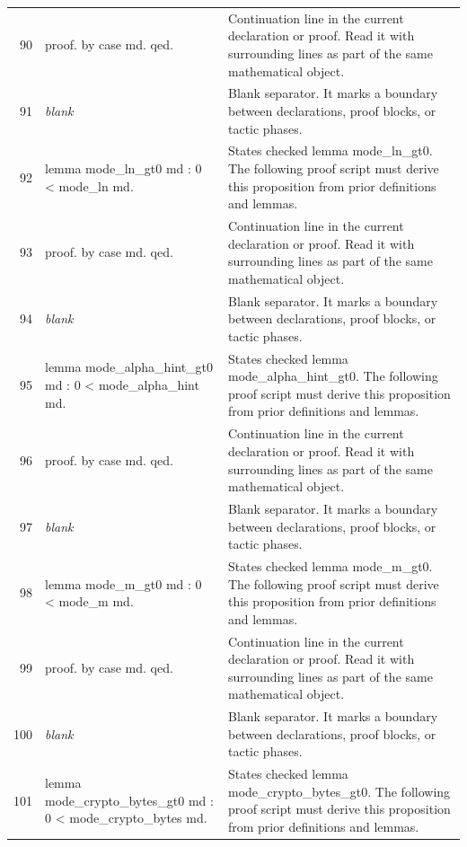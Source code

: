 \documentclass[10pt]{article}
\begin{document}
\begin{longtable}{r L{0.53\textwidth} L{0.37\textwidth}}
90 & {\ttfamily\scriptsize proof. by case md. qed.} & Continuation line in the current declaration or proof.  Read it with surrounding lines as part of the same mathematical object. \\
91 & {\ttfamily\scriptsize \emph{blank}} & Blank separator.  It marks a boundary between declarations, proof blocks, or tactic phases. \\
92 & {\ttfamily\scriptsize lemma mode\_ln\_gt0 md : 0 < mode\_ln md.} & States checked lemma mode\_ln\_gt0.  The following proof script must derive this proposition from prior definitions and lemmas. \\
93 & {\ttfamily\scriptsize proof. by case md. qed.} & Continuation line in the current declaration or proof.  Read it with surrounding lines as part of the same mathematical object. \\
94 & {\ttfamily\scriptsize \emph{blank}} & Blank separator.  It marks a boundary between declarations, proof blocks, or tactic phases. \\
95 & {\ttfamily\scriptsize lemma mode\_alpha\_hint\_gt0 md : 0 < mode\_alpha\_hint md.} & States checked lemma mode\_alpha\_hint\_gt0.  The following proof script must derive this proposition from prior definitions and lemmas. \\
96 & {\ttfamily\scriptsize proof. by case md. qed.} & Continuation line in the current declaration or proof.  Read it with surrounding lines as part of the same mathematical object. \\
97 & {\ttfamily\scriptsize \emph{blank}} & Blank separator.  It marks a boundary between declarations, proof blocks, or tactic phases. \\
98 & {\ttfamily\scriptsize lemma mode\_m\_gt0 md : 0 < mode\_m md.} & States checked lemma mode\_m\_gt0.  The following proof script must derive this proposition from prior definitions and lemmas. \\
99 & {\ttfamily\scriptsize proof. by case md. qed.} & Continuation line in the current declaration or proof.  Read it with surrounding lines as part of the same mathematical object. \\
100 & {\ttfamily\scriptsize \emph{blank}} & Blank separator.  It marks a boundary between declarations, proof blocks, or tactic phases. \\
101 & {\ttfamily\scriptsize lemma mode\_crypto\_bytes\_gt0 md : 0 < mode\_crypto\_bytes md.} & States checked lemma mode\_crypto\_bytes\_gt0.  The following proof script must derive this proposition from prior definitions and lemmas. \\

\end{longtable}
\end{document}
